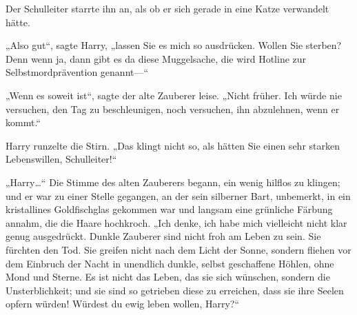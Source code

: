 Der Schulleiter starrte ihn an, als ob er sich gerade in eine Katze verwandelt hätte.

„Also gut“, sagte Harry, „lassen Sie es mich so ausdrücken. Wollen Sie sterben? Denn wenn ja, dann gibt es da diese Muggelsache, die wird Hotline zur Selbstmordprävention genannt—“

„Wenn es soweit ist“, sagte der alte Zauberer leise. „Nicht früher. Ich würde nie versuchen, den Tag zu beschleunigen, noch versuchen, ihn abzulehnen, wenn er kommt.“

Harry runzelte die Stirn. „Das klingt nicht so, als hätten Sie einen sehr starken Lebenswillen, Schulleiter!“

„Harry…“ Die Stimme des alten Zauberers begann, ein wenig hilflos zu klingen; und er war zu einer Stelle gegangen, an der sein silberner Bart, unbemerkt, in ein kristallines Goldfischglas gekommen war und langsam eine grünliche Färbung annahm, die die Haare hochkroch. „Ich denke, ich habe mich vielleicht nicht klar genug ausgedrückt. Dunkle Zauberer sind nicht froh am Leben zu sein. Sie fürchten den Tod. Sie greifen nicht nach dem Licht der Sonne, sondern fliehen vor dem Einbruch der Nacht in unendlich dunkle, selbst geschaffene Höhlen, ohne Mond und Sterne. Es ist nicht das Leben, das sie sich wünschen, sondern die Unsterblichkeit; und sie sind so getrieben diese zu erreichen, dass sie ihre Seelen opfern würden! Würdest du ewig leben wollen, Harry?“

